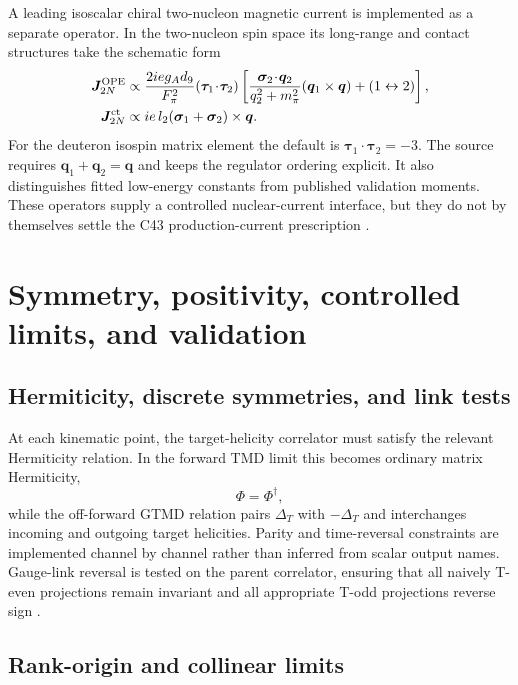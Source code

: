 \documentclass[11pt,oneside]{book}
\begin{document}
A leading isoscalar chiral two-nucleon magnetic current is implemented as a separate operator.  In the two-nucleon spin space its long-range and contact structures take the schematic form
\begin{align}
 \bm J_{2N}^{\rm OPE}
 &\propto
 \frac{2ie g_A d_9}{F_\pi^2}
 (\bm\tau_1\!\cdot\!\bm\tau_2)
 \left[
 \frac{\bm\sigma_2\!\cdot\!\bm q_2}{q_2^2+m_\pi^2}
 (\bm q_1\times\bm q)
 +(1\leftrightarrow2)
 \right],
 \label{eq:two-body-ope}\\
 \bm J_{2N}^{\rm ct}
 &\propto ie\,l_2(\bm\sigma_1+\bm\sigma_2)\times\bm q.
 \label{eq:two-body-contact}
\end{align}
For the deuteron isospin matrix element the default is $\bm\tau_1\cdot\bm\tau_2=-3$.  The source requires $\bm q_1+\bm q_2=\bm q$ and keeps the regulator ordering explicit.  It also distinguishes fitted low-energy constants from published validation moments.  These operators supply a controlled nuclear-current interface, but they do not by themselves settle the C43 production-current prescription \cite{KollingEpelbaumPhillips2012,Schiavilla2019}.

\chapter{Symmetry, positivity, controlled limits, and validation}
\label{chap:validation}

\section{Hermiticity, discrete symmetries, and link tests}

At each kinematic point, the target-helicity correlator must satisfy the relevant Hermiticity relation.  In the forward TMD limit this becomes ordinary matrix Hermiticity,
\begin{equation}
 \Phi=\Phi^\dagger,
 \label{eq:tmd-hermiticity}
\end{equation}
while the off-forward GTMD relation pairs $\Delta_T$ with $-\Delta_T$ and interchanges incoming and outgoing target helicities.  Parity and time-reversal constraints are implemented channel by channel rather than inferred from scalar output names.  Gauge-link reversal is tested on the parent correlator, ensuring that all naively T-even projections remain invariant and all appropriate T-odd projections reverse sign \cite{MeissnerMetzSchlegel2009,BoerMuldersPijlman2003,BoerEtAl2016}.

\section{Rank-origin and collinear limits}
\end{document}
